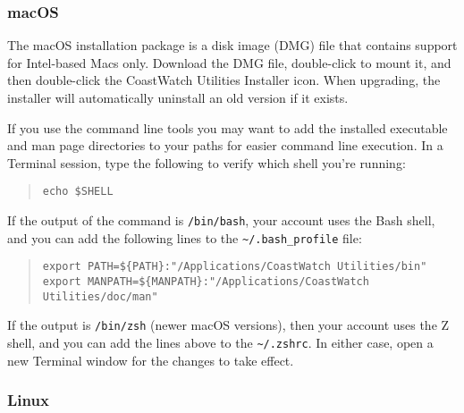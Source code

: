 \subsubsection{macOS}

The macOS installation package is a disk image (DMG) file that
contains support for Intel-based Macs only.  Download the DMG file,
double-click to mount it, and then
double-click the {\gui CoastWatch Utilities Installer} icon.
When upgrading, the installer will automatically uninstall an old version if
it exists.

If you use the command line tools you may want to add the installed
executable and man page directories to your paths for easier command line execution.
In a {\gui Terminal} session, type the following to verify which shell you're running:
\begin{quote}
  {\tt echo \$SHELL}
\end{quote}
If the output of the command is {\tt /bin/bash}, your account uses the Bash
shell, and you can add the following lines to the {\tt \~{ }/.bash\_profile}
file:
\begin{quote}
  {\tt export PATH=\$\{PATH\}:"/Applications/CoastWatch Utilities/bin"} \\
  {\tt export MANPATH=\$\{MANPATH\}:"/Applications/CoastWatch Utilities/doc/man"}
\end{quote}
If the output is {\tt /bin/zsh} (newer macOS versions), then your account uses 
the Z shell, and you can add the lines above to the {\tt \~{ }/.zshrc}.
In either case, open a new {\gui Terminal} window for the changes to take effect.

\subsubsection{Linux}

